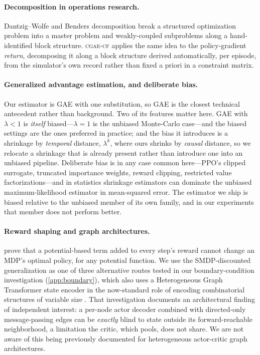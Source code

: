 \documentclass[review,authoryear,3p,times]{elsarticle}
\newcommand{\cflow}{\textsc{cgae-cf}}          %
\begin{document}
\paragraph{Decomposition in operations research.} Dantzig--Wolfe
\citep{dantzig1960decomposition} and Benders \citep{benders1962partitioning}
decomposition break a structured optimization problem into a master problem and
weakly-coupled subproblems along a hand-identified block structure. \cflow{}
applies the same idea to the policy-gradient \emph{return}, decomposing it along
a block structure derived automatically, per episode, from the simulator's own
record rather than fixed a priori in a constraint matrix.

\paragraph{Generalized advantage estimation, and deliberate bias.} Our
estimator is GAE \citep{gae2016} with one substitution, so GAE is the closest
technical antecedent rather than background. Two of its features matter here.
GAE with $\lambda<1$ is \emph{itself} biased---$\lambda=1$ is the unbiased
Monte-Carlo case---and the biased settings are the ones preferred in practice;
and the bias it introduces is a shrinkage by \emph{temporal} distance,
$\lambda^k$, where ours shrinks by \emph{causal} distance, so we relocate a
shrinkage that is already present rather than introduce one into an unbiased
pipeline. Deliberate bias is in any case common here---PPO's clipped surrogate,
truncated importance weights, reward clipping, restricted value
factorizations---and in statistics shrinkage estimators can dominate the
unbiased maximum-likelihood estimator in mean-squared error. The estimator we
ship is biased relative to the unbiased member of its own family, and in our
experiments that member does not perform better.

\paragraph{Reward shaping and graph architectures.} \citet{ng1999shaping} prove
that a potential-based term added to every step's reward cannot change an MDP's
optimal policy, for any potential function. We use the SMDP-discounted
generalization as one of three alternative routes tested in our
boundary-condition investigation (\ref{app:boundary}), which also uses
a Heterogeneous Graph Transformer \citep{hu2020hgt} state encoder in the
now-standard role of encoding combinatorial structures of variable size
\citep{khalil2017learning,zhang2020jobshop}. That investigation documents an
architectural finding of independent interest: a per-node actor decoder combined
with directed-only message-passing edges can be \emph{exactly} blind to state
outside its forward-reachable neighborhood, a limitation the critic, which
pools, does not share. We are not aware of this being previously documented for
heterogeneous actor-critic graph architectures.
\end{document}
